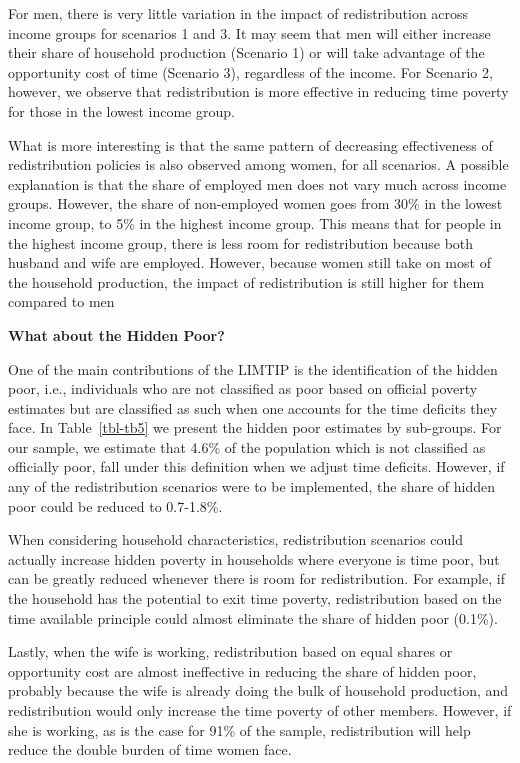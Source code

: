 \documentclass[
  11pt,
]{article}
\begin{document}
For men, there is very little variation in the impact of redistribution
across income groups for scenarios 1 and 3. It may seem that men will
either increase their share of household production (Scenario 1) or will
take advantage of the opportunity cost of time (Scenario 3), regardless
of the income. For Scenario 2, however, we observe that redistribution
is more effective in reducing time poverty for those in the lowest
income group.

What is more interesting is that the same pattern of decreasing
effectiveness of redistribution policies is also observed among women,
for all scenarios. A possible explanation is that the share of employed
men does not vary much across income groups. However, the share of
non-employed women goes from 30\% in the lowest income group, to 5\% in
the highest income group. This means that for people in the highest
income group, there is less room for redistribution because both husband
and wife are employed. However, because women still take on most of the
household production, the impact of redistribution is still higher for
them compared to men

\textbf{What about the Hidden Poor?}

One of the main contributions of the LIMTIP is the identification of the
hidden poor, i.e., individuals who are not classified as poor based on
official poverty estimates but are classified as such when one accounts
for the time deficits they face. In Table~\ref{tbl-tb5} we present the
hidden poor estimates by sub-groups. For our sample, we estimate that
4.6\% of the population which is not classified as officially poor, fall
under this definition when we adjust time deficits. However, if any of
the redistribution scenarios were to be implemented, the share of hidden
poor could be reduced to 0.7-1.8\%.

When considering household characteristics, redistribution scenarios
could actually increase hidden poverty in households where everyone is
time poor, but can be greatly reduced whenever there is room for
redistribution. For example, if the household has the potential to exit
time poverty, redistribution based on the time available principle could
almost eliminate the share of hidden poor (0.1\%).

Lastly, when the wife is working, redistribution based on equal shares
or opportunity cost are almost ineffective in reducing the share of
hidden poor, probably because the wife is already doing the bulk of
household production, and redistribution would only increase the time
poverty of other members. However, if she is working, as is the case for
91\% of the sample, redistribution will help reduce the double burden of
time women face.
\end{document}
